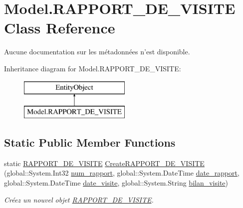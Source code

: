 \hypertarget{class_model_1_1_r_a_p_p_o_r_t___d_e___v_i_s_i_t_e}{\section{Model.\-R\-A\-P\-P\-O\-R\-T\-\_\-\-D\-E\-\_\-\-V\-I\-S\-I\-T\-E Class Reference}
\label{class_model_1_1_r_a_p_p_o_r_t___d_e___v_i_s_i_t_e}
}


Aucune documentation sur les métadonnées n'est disponible.  


Inheritance diagram for Model.\-R\-A\-P\-P\-O\-R\-T\-\_\-\-D\-E\-\_\-\-V\-I\-S\-I\-T\-E\-:\begin{figure}[H]
\begin{center}
\leavevmode
\includegraphics[height=2.000000cm]{class_model_1_1_r_a_p_p_o_r_t___d_e___v_i_s_i_t_e}
\end{center}
\end{figure}
\subsection*{Static Public Member Functions}
\begin{DoxyCompactItemize}
\item 
static \hyperlink{class_model_1_1_r_a_p_p_o_r_t___d_e___v_i_s_i_t_e}{R\-A\-P\-P\-O\-R\-T\-\_\-\-D\-E\-\_\-\-V\-I\-S\-I\-T\-E} \hyperlink{class_model_1_1_r_a_p_p_o_r_t___d_e___v_i_s_i_t_e_afa4d9449adaeca7892e1ac70f28dcd04}{Create\-R\-A\-P\-P\-O\-R\-T\-\_\-\-D\-E\-\_\-\-V\-I\-S\-I\-T\-E} (global\-::\-System.\-Int32 \hyperlink{class_model_1_1_r_a_p_p_o_r_t___d_e___v_i_s_i_t_e_a09579a805a9a16ca3d590de786e1f2ff}{num\-\_\-rapport}, global\-::\-System.\-Date\-Time \hyperlink{class_model_1_1_r_a_p_p_o_r_t___d_e___v_i_s_i_t_e_a0158656f483091006f9c9a9ba5faa9ad}{date\-\_\-rapport}, global\-::\-System.\-Date\-Time \hyperlink{class_model_1_1_r_a_p_p_o_r_t___d_e___v_i_s_i_t_e_a3ededfc7a2aa19b96cb389900c2e6e36}{date\-\_\-visite}, global\-::\-System.\-String \hyperlink{class_model_1_1_r_a_p_p_o_r_t___d_e___v_i_s_i_t_e_a916f42e4c755e24452e9037997dfbb35}{bilan\-\_\-visite})
\begin{DoxyCompactList}\small\item\em Créez un nouvel objet \hyperlink{class_model_1_1_r_a_p_p_o_r_t___d_e___v_i_s_i_t_e}{R\-A\-P\-P\-O\-R\-T\-\_\-\-D\-E\-\_\-\-V\-I\-S\-I\-T\-E}. \end{DoxyCompactList}\end{DoxyCompactItemize}
